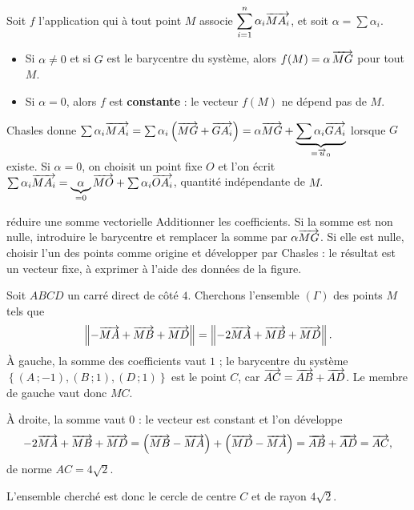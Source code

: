 \begin{theoreme}
Soit $f$ l'application qui à tout point $M$ associe
$\displaystyle\sum_{i=1}^{n}\alpha_{i}\overrightarrow{MA_{i}}$, et soit
$\alpha = \sum \alpha_{i}$.
\begin{itemize}[leftmargin=*, itemsep=0.1em]
  \item Si $\alpha \neq 0$ et si $G$ est le barycentre du système, alors
        $f(M) = \alpha\,\overrightarrow{MG}$ pour tout $M$.
  \item Si $\alpha = 0$, alors $f$ est \textbf{constante} : le vecteur
        $f(M)$ ne dépend pas de $M$.
\end{itemize}
\end{theoreme}

\begin{demonstration}
Chasles donne $\sum \alpha_{i}\overrightarrow{MA_{i}}
= \sum \alpha_{i}\left(\overrightarrow{MG}+\overrightarrow{GA_{i}}\right)
= \alpha\overrightarrow{MG}+\underbrace{\sum \alpha_{i}\overrightarrow{GA_{i}}}_{= \overrightarrow{u}_{0}}$
lorsque $G$ existe. Si $\alpha = 0$, on choisit un point fixe $O$ et l'on
écrit $\sum \alpha_{i}\overrightarrow{MA_{i}}
= \underbrace{\alpha}_{=0}\overrightarrow{MO}+\sum \alpha_{i}\overrightarrow{OA_{i}}$, quantité
indépendante de $M$.
\end{demonstration}

\begin{methode}{réduire une somme vectorielle}
Additionner les coefficients. Si la somme est non nulle, introduire le
barycentre et remplacer la somme par $\alpha\overrightarrow{MG}$. Si elle est nulle,
choisir l'un des points comme origine et développer par Chasles : le résultat
est un vecteur fixe, à exprimer à l'aide des données de la figure.
\end{methode}

\begin{exemple}
Soit $ABCD$ un carré direct de côté $4$. Cherchons l'ensemble $(\Gamma)$ des
points $M$ tels que
\[
  \left\lVert -\overrightarrow{MA}+\overrightarrow{MB}+\overrightarrow{MD} \right\rVert
  = \left\lVert -2\overrightarrow{MA}+\overrightarrow{MB}+\overrightarrow{MD} \right\rVert .
\]
À gauche, la somme des coefficients vaut $1$ ; le barycentre du système
$\left\{(A\,;-1),(B\,;1),(D\,;1)\right\}$ est le point $C$, car
$\overrightarrow{AC} = \overrightarrow{AB}+\overrightarrow{AD}$. Le membre de gauche vaut donc $MC$.

À droite, la somme vaut $0$ : le vecteur est constant et l'on développe
\[
  -2\overrightarrow{MA}+\overrightarrow{MB}+\overrightarrow{MD}
  = \left(\overrightarrow{MB}-\overrightarrow{MA}\right)+\left(\overrightarrow{MD}-\overrightarrow{MA}\right)
  = \overrightarrow{AB}+\overrightarrow{AD} = \overrightarrow{AC},
\]
de norme $AC = 4\sqrt2$.

L'ensemble cherché est donc le cercle de centre $C$ et de rayon $4\sqrt2$.
\end{exemple}

